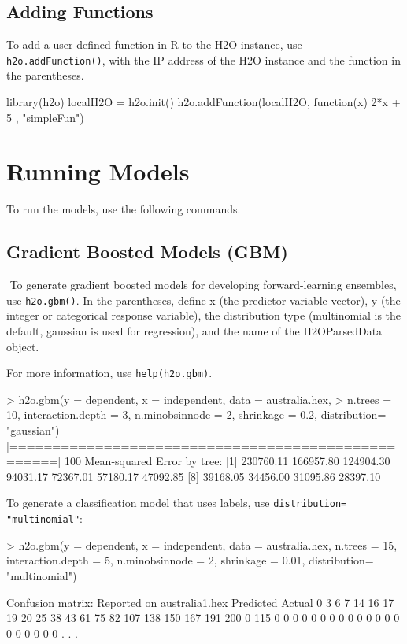 \documentclass[11pt]{article}
\begin{document}
\subsection{Adding Functions}

To add a user-defined function in R to the H2O instance, use {\texttt{h2o.addFunction()}}, with the IP address of the H2O instance and the function in the parentheses.  
\begin{spverbatim}
library(h2o)
localH2O = h2o.init()
h2o.addFunction(localH2O, function(x) { 2*x + 5 }, "simpleFun")
\end{spverbatim}


\section{Running Models}

To run the models, use the following commands. 
\subsection{Gradient Boosted Models (GBM)}
 To generate gradient boosted models for developing forward-learning ensembles, use {\texttt{h2o.gbm()}}.  In the parentheses, define x (the predictor variable vector), y (the integer or categorical response variable), the distribution type (multinomial is the default, gaussian is used for regression), and the name of the H2OParsedData object. 

For more information, use {\texttt{help(h2o.gbm)}}.
\begin{spverbatim}
> h2o.gbm(y = dependent, x = independent, data = australia.hex,
> n.trees = 10, interaction.depth = 3,
   n.minobsinnode = 2, shrinkage = 0.2, distribution= "gaussian")
     |===================================================| 100%
 Mean-squared Error by tree:
  [1] 230760.11 166957.80 124904.30  94031.17  72367.01  57180.17  47092.85
  [8]  39168.05  34456.00  31095.86  28397.10

\end{spverbatim}

To generate a classification model that uses labels, use {\texttt{distribution= "multinomial"}}: 
\begin{spverbatim}
> h2o.gbm(y = dependent, x = independent, data = australia.hex, n.trees
= 15, interaction.depth = 5,
 n.minobsinnode = 2, shrinkage = 0.01, distribution= "multinomial")
   
Confusion matrix:
Reported on australia1.hex
Predicted
Actual     0 3 6 7 14 16 17 19 20 25 38 43 61 75 82 107 138 150 167 191 200
  0      115 0 0 0  0  0  0  0  0  0  0  0  0  0  0   0   0   0   0   0   0
. . .
\end{spverbatim}
\end{document}
